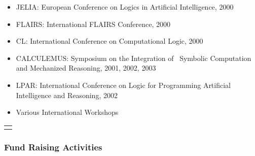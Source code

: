 \documentclass{letter}
\begin{document}
\begin{itemize}
  \item JELIA: {\small European Conference on Logics in Artificial
  Intelligence}, 2000
  
  \item FLAIRS: International FLAIRS Conference, 2000
  
  \item CL: International Conference on Computational Logic, 2000
  
  \item CALCULEMUS: {\small Symposium on the Integration of \ Symbolic
  Computation and Mechanized Reasoning, 2001, 2002, 2003}
  
  \item LPAR: {\small International Conference on Logic for Programming
  Artificial Intelligence and Reasoning}, 2002
  
  \item {\small Various International Workshops}
\end{itemize}
{\noindent}\begin{tabular}{l}
  \hline
  \quad
\end{tabular}

\subsubsection*{Fund Raising Activities}
\end{document}
